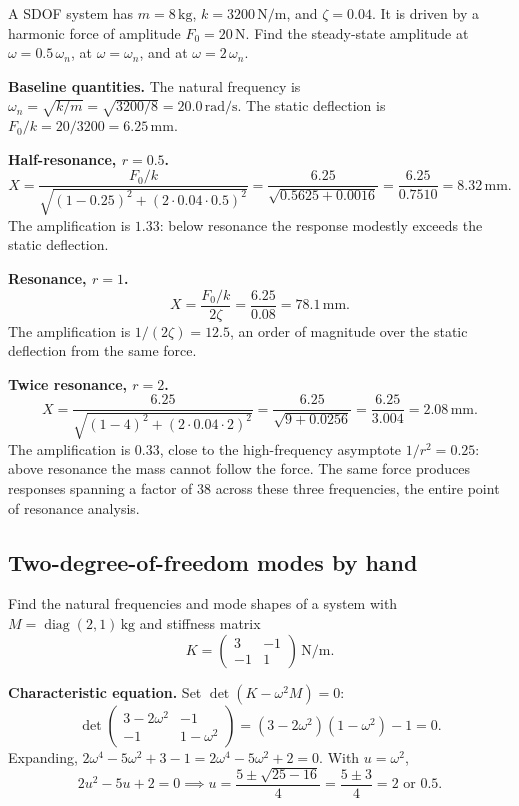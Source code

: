 A SDOF system has $m = 8\,\si{\kilogram}$, $k = 3200\,\si{\newton\per
\meter}$, and $\zeta = 0.04$. It is driven by a harmonic force of
amplitude $F_0 = 20\,\text{N}$. Find the steady-state amplitude at
$\omega = 0.5\,\omega_n$, at $\omega = \omega_n$, and at $\omega =
2\,\omega_n$.

\textbf{Baseline quantities.} The natural frequency is $\omega_n =
\sqrt{k/m} = \sqrt{3200/8} = 20.0\,\si{\radian\per\second}$. The
static deflection is $F_0/k = 20/3200 = 6.25\,\si{\milli\meter}$.

\textbf{Half-resonance, $r = 0.5$.}
\[
X = \frac{F_0/k}{\sqrt{(1 - 0.25)^2 + (2\cdot 0.04\cdot 0.5)^2}} =
\frac{6.25}{\sqrt{0.5625 + 0.0016}} = \frac{6.25}{0.7510} = 8.32\,\si{
\milli\meter}.
\]
The amplification is $1.33$: below resonance the response modestly
exceeds the static deflection.

\textbf{Resonance, $r = 1$.}
\[
X = \frac{F_0/k}{2\zeta} = \frac{6.25}{0.08} = 78.1\,\si{\milli\meter}.
\]
The amplification is $1/(2\zeta) = 12.5$, an order of magnitude over
the static deflection from the same force.

\textbf{Twice resonance, $r = 2$.}
\[
X = \frac{6.25}{\sqrt{(1 - 4)^2 + (2\cdot 0.04\cdot 2)^2}} =
\frac{6.25}{\sqrt{9 + 0.0256}} = \frac{6.25}{3.004} = 2.08\,\si{\milli
\meter}.
\]
The amplification is $0.33$, close to the high-frequency asymptote
$1/r^2 = 0.25$: above resonance the mass cannot follow the force. The
same force produces responses spanning a factor of $38$ across these
three frequencies, the entire point of resonance analysis.

\subsection{Two-degree-of-freedom modes by hand}

Find the natural frequencies and mode shapes of a system with
$M = \operatorname{diag}(2, 1)\,\si{\kilogram}$ and stiffness matrix
\[
K = \begin{pmatrix} 3 & -1 \\ -1 & 1 \end{pmatrix}\,\si{\newton\per
\meter}.
\]

\textbf{Characteristic equation.} Set $\det(K - \omega^2 M) = 0$:
\[
\det\begin{pmatrix} 3 - 2\omega^2 & -1 \\ -1 & 1 - \omega^2
\end{pmatrix} = (3 - 2\omega^2)(1 - \omega^2) - 1 = 0.
\]
Expanding, $2\omega^4 - 5\omega^2 + 3 - 1 = 2\omega^4 - 5\omega^2 + 2
= 0$. With $u = \omega^2$,
\[
2u^2 - 5u + 2 = 0 \implies u = \frac{5 \pm \sqrt{25 - 16}}{4} =
\frac{5 \pm 3}{4} = 2 \text{ or } 0.5.
\]

